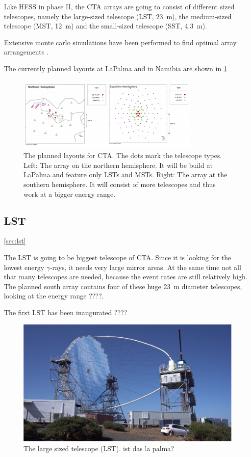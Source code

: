 Like HESS in phase II, the CTA arrays are going to consist of different sized telescopes, namely
the large-sized telescope (LST, \SI{23}{\meter}), 
the medium-sized telescope (MST, \SI{12}{\meter}) 
and the small-sized telescope (SST, \SI{4.3}{\meter}).

Extensive monte carlo simulations have been performed to find optimal array arrangements
\cite{BERNLOHR2013171}.

The currently planned layouts at LaPalma and in Namibia are shown in 
\ref{fig:cta_layout}

\begin{figure}
	\center
	\includegraphics[width=0.8\textwidth]{images/cta_layout.png}
	\caption{The planned layouts for CTA. The dots mark the telescope types.
	Left: The array on the northern hemisphere. It will be build at LaPalma
	and feature only LSTs and MSTs.
	Right: The array at the southern hemisphere.
	It will consist of more telescopes and thus 
	work at a bigger energy range.
	\cite{cta_web}}
	\label{fig:cta_layout}
\end{figure}


\subsection{LST}
\ref{sec:lst}

The LST is going to be biggest telescope of CTA.
Since it is looking for the lowest energy $\gamma$-rays, it needs
very large mirror areas. At the same time not all that many telescopes are needed,
because the event rates are still relatively high.
The planned south array contains four of these huge \SI{23}{\meter} diameter telescopes,
looking at the energy range ????.

The first LST has been inaugurated ???? \cite{????}

\begin{figure}
	\center
	\includegraphics[width=.5\textwidth]{images/lst.jpeg}
	\caption{The large sized telescope (LST). ist das la palma? \cite{cta_web}}
	\label{fig:lst}
\end{figure}

